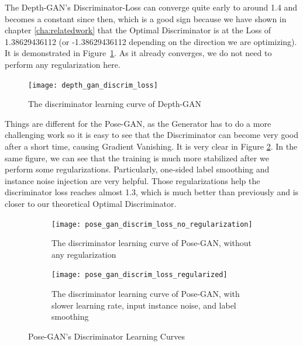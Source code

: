 The Depth-GAN's Discriminator-Loss can converge quite early to around 1.4 and becomes a
constant since then, which is a good sign because we have shown in chapter
\ref{cha:relatedwork} that the Optimal Discriminator is at the Loss of 1.38629436112 (or
-1.38629436112 depending on the direction we are optimizing). It is demonstrated in
Figure~\ref{fig:depth_gan_discrim_loss}. As it already converges, we do not need to
perform any regularization here.

\begin{figure}[h!]
	\centering
	\texttt{[image: depth\_gan\_discrim\_loss]}
	\caption{The discriminator learning curve of Depth-GAN}
	\label{fig:depth_gan_discrim_loss}
\end{figure}

Things are different for the Pose-GAN, as the Generator has to do a more challenging work
so it is easy to see that the Discriminator can become very good after a short time,
causing Gradient Vanishing. It is very clear in Figure \ref{fig:pose_gan_discrim_loss}. In
the same figure, we can see that the training is much more stabilized after we perform
some regularizations. Particularly, one-sided label smoothing and instance noise injection
are very helpful. Those regularizations help the discriminator loss reaches almost 1.3,
which is much better than previously and is closer to our theoretical Optimal
Discriminator.

\begin{figure}[h!]
	\centering
	
	\begin{subfigure}{\textwidth}
		\begin{center}
			\texttt{[image: pose\_gan\_discrim\_loss\_no\_regularization]}
		\end{center}
		\caption{The discriminator learning curve of Pose-GAN, without any regularization}
	\end{subfigure}

	\begin{subfigure}{\textwidth}
		\begin{center}
			\texttt{[image: pose\_gan\_discrim\_loss\_regularized]}
		\end{center}
		\caption{The discriminator learning curve of Pose-GAN, with slower learning rate,
		input instance noise, and label smoothing}
	\end{subfigure}
	\caption{Pose-GAN's Discriminator Learning Curves}
	\label{fig:pose_gan_discrim_loss}
\end{figure}

